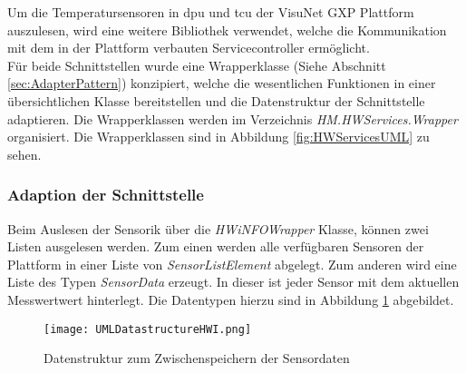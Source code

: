 Um die Temperatursensoren in \ac{dpu} und \ac{tcu} der VisuNet GXP Plattform auszulesen, wird eine weitere Bibliothek verwendet, welche die Kommunikation mit dem in der Plattform verbauten Servicecontroller ermöglicht.\\
Für beide Schnittstellen wurde eine Wrapperklasse (Siehe Abschnitt \ref{sec:AdapterPattern}) konzipiert, welche die wesentlichen Funktionen in einer übersichtlichen Klasse bereitstellen und die Datenstruktur der Schnittstelle adaptieren. Die Wrapperklassen werden im Verzeichnis \textit{HM.HWServices.Wrapper} organisiert. Die Wrapperklassen sind in Abbildung \ref{fig:HWServicesUML} zu sehen.
\subsubsection*{Adaption der Schnittstelle}
Beim Auslesen der Sensorik über die \textit{HWiNFOWrapper} Klasse, können zwei Listen ausgelesen werden. Zum einen werden alle verfügbaren Sensoren der Plattform in einer Liste von \textit{SensorListElement} abgelegt. Zum anderen wird eine Liste des Typen \textit{SensorData} erzeugt. In dieser ist jeder Sensor mit dem aktuellen Messwertwert hinterlegt. Die Datentypen hierzu sind in Abbildung \ref{fig:DatastructuresUML} abgebildet.      
\begin{center}
    \begin{figure}[h!]
        \centering
        \texttt{[image: UMLDatastructureHWI.png]}
        \caption{Datenstruktur zum Zwischenspeichern der Sensordaten}
        \label{fig:DatastructuresUML}
    \end{figure}
\end{center}
\vspace{-1.8cm}

